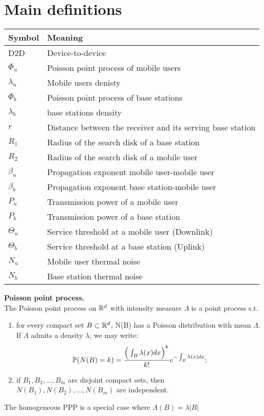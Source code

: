 \newpage
\section{Main definitions}
\begin{center}
    \begin{tabular}{ | l | p{7cm} |}
        \hline
        Symbol & {\hspace {3cm}Meaning} \\ \hline
		D2D & Device-to-device \\ \hline
        ${\Phi_u}$ & Poisson point process of mobile users \\ \hline
        ${\lambda_u}$ & Mobile users denisty \\ \hline
        ${\Phi_b}$ & Poisson point process of base stations \\ \hline
        ${\lambda_b}$ & base stations density \\ \hline
        $r$ & Distance between the receiver and its serving base station \\ \hline
        $R_1$ & Radius of the search disk of a base station \\ \hline
        $R_2$ & Radius of the search disk of a mobile user \\ \hline
		${\beta_u}$ & Propagation exponent mobile user-mobile user \\ \hline
		${\beta_b}$ & Propagation exponent base station-mobile user \\ \hline
		$P_u$ & Transmission power of a mobile user \\ \hline
		$P_b$ & Transmission power of a base station \\ \hline
		${\Theta_u}$ & Service threshold at a mobile user (Downlink) \\ \hline
		${\Theta_b}$ & Service threshold at a base station (Uplink) \\ \hline
		$N_u$ & Mobile user thermal noise \\ \hline
		$N_b$ & Base station thermal noise\\ \hline
    \end{tabular}
\end{center}
\begin{framed}
\par{\bf Poisson point process.} \\
The Poisson point process on $\R^d$ with intensity measure $\Lambda$ is a point process s.t.
  \begin{enumerate}
    \item for every compact set $B\subset\R^d$, N(B) has a Poisson distribution with mean $\Lambda$. If $\Lambda$ admits a density $\lambda$, we may write:
	$$\P(N(B)=k)=\frac{{\Big(\int_B\lambda (x)dx\Big)}^k}{k!} e^{-\int_B\lambda (x)dx};$$
	\item if $B_1,B_2,...,B_m$ are disjoint compact sets, then $N(B_1), N(B_2),..., N(B_m)$ are independent.	
  \end{enumerate}
The homogeneous PPP is a special case where $\Lambda (B)=\lambda|B|$  
\end{framed}
